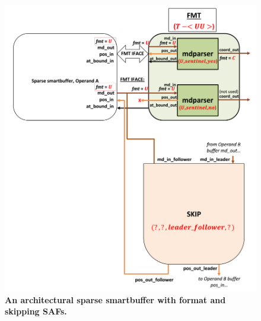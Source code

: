 \begin{figure}[ht]
\includegraphics[width=\textwidth]{figures/safinference_build_07buffportfmt.png}
\caption{\textbf{An architectural sparse smartbuffer with format and skipping SAFs.}}
\label{fig:safinference_build_07buffportfmt}
\centering
\end{figure}



